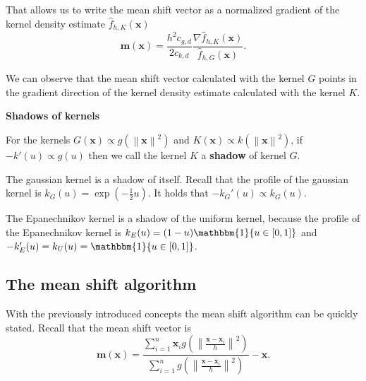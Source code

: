 \documentclass{article}
\newcommand{\norm}[1]{\left\lVert#1\right\rVert}
\begin{document}
That allows us to write the mean shift vector as a normalized gradient of the kernel density estimate $\hat{f}_{h,K}(\bm{x})$
\begin{equation}
	\bm{m}(\bm{x}) = \frac{h^2c_{g,d}}{2c_{k,d}} \frac{\nabla \hat{f}_{h,K}(\bm{x})}{\hat{f}_{h,G}(\bm{x})}\text{.}
\end{equation}

We can observe that the mean shift vector calculated with the kernel $G$ points in the gradient direction of the kernel density estimate calculated with the kernel $K$.

\textbf{Shadows of kernels}

For the kernels $G(\bm{x}) \propto g(\norm{\bm{x}}^2)$ and $K(\bm{x}) \propto k(\norm{\bm{x}}^2)$, if $-k'(u) \propto g(u)$ then we call the kernel $K$ a \textbf{shadow} of kernel $G$.

The gaussian kernel is a shadow of itself. Recall that the profile of the gaussian kernel is $k_G(u) = \exp\left(-\frac{1}{2}u\right)$. It holds that $-k_G'(u) \propto k_G(u)$.

The Epanechnikov kernel is a shadow of the uniform kernel, because the profile of the Epanechnikov kernel is $k_E(u) = (1 - u) \mathbbm{1}\{u \in [0, 1]\}$ and $-k_E'(u) = k_U(u) = \mathbbm{1}\{u \in [0, 1]\}$.





\subsection{The mean shift algorithm} \label{sec:mean-shift-algorithm}

With the previously introduced concepts the mean shift algorithm can be quickly stated. Recall that the mean shift vector is
\begin{equation}
\bm{m}(\bm{x}) = \frac{\sum_{i=1}^n \bm{x}_i g\left(\norm{\frac{\bm{x} - \bm{x}_i}{h}}^2 \right)}{\sum_{i=1}^n g\left(\norm{\frac{\bm{x} - \bm{x}_i}{h}}^2 \right)} - \bm{x}\text{.}
\end{equation}
\end{document}
